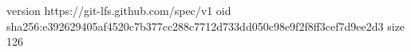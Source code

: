 version https://git-lfs.github.com/spec/v1
oid sha256:e392629405af4520c7b377cc288c7712d733dd050c98e9f2f8ff3cef7d9ee2d3
size 126
